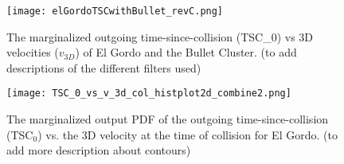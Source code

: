 \begin{figure} 
	\texttt{[image: elGordoTSCwithBullet\_revC.png]}
	\caption{The marginalized outgoing time-since-collision (TSC_0) vs 3D
velocities ($v_{3D}$) of El Gordo and the Bullet Cluster. (to add
descriptions of the different filters used) }
\end{figure}

\begin{figure}
	\texttt{[image: TSC\_0\_vs\_v\_3d\_col\_histplot2d\_combine2.png]}
	\caption{The marginalized output PDF of the outgoing time-since-collision
(TSC$_0$) vs. the 3D velocity at the time of collision for El Gordo. (to
add more description about contours) }
	\label{fig:TSC_v3D}
\end{figure}

% 


